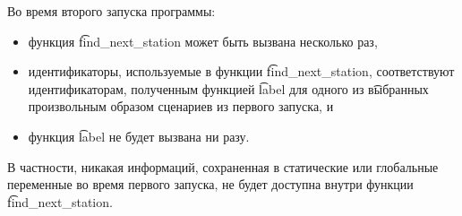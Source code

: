 Во время второго запуска программы:
\begin{itemize}
\item функция \t{find\_next\_station} может быть вызвана несколько раз,
\item идентификаторы, используемые в функции \t{find\_next\_station}, соответствуют идентификаторам, полученным функцией \t{label} для одного из \t{выбранных произвольным образом} сценариев из первого запуска, и
\item функция \t{label} не будет вызвана ни разу.
\end{itemize}

В частности, никакая информаций, сохраненная в статические или глобальные переменные во время первого запуска, не будет доступна внутри функции  \t{find\_next\_station}.



